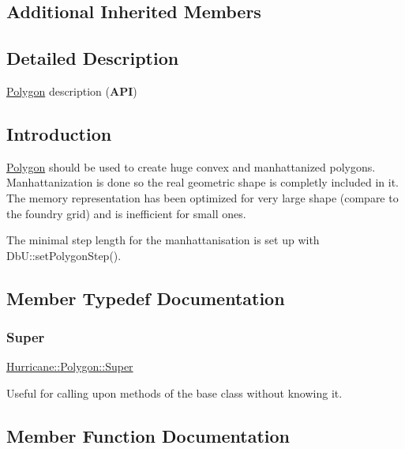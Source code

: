\subsection*{Additional Inherited Members}


\subsection{Detailed Description}
\hyperlink{classHurricane_1_1Polygon}{Polygon} description ({\bfseries A\+PI}) 

\hypertarget{classHurricane_1_1Polygon_secPolygonIntro}{}\subsection{Introduction}\label{classHurricane_1_1Polygon_secPolygonIntro}
\hyperlink{classHurricane_1_1Polygon}{Polygon} should be used to create huge convex and manhattanized polygons. Manhattanization is done so the real geometric shape is completly included in it. The memory representation has been optimized for very large shape (compare to the foundry grid) and is inefficient for small ones.

The minimal step length for the manhattanisation is set up with Db\+U\+::set\+Polygon\+Step(). 

\subsection{Member Typedef Documentation}
\mbox{\label{classHurricane_1_1Polygon_adac4dcd1480b81e7778775540b95f81c}} 
\subsubsection{\texorpdfstring{Super}{Super}}
{\footnotesize\ttfamily \hyperlink{classHurricane_1_1Polygon_adac4dcd1480b81e7778775540b95f81c}{Hurricane\+::\+Polygon\+::\+Super}}

Useful for calling upon methods of the base class without knowing it. 

\subsection{Member Function Documentation}
\mbox{\label{classHurricane_1_1Polygon_ac248679558ff51bf509b28050027b7da}} 
